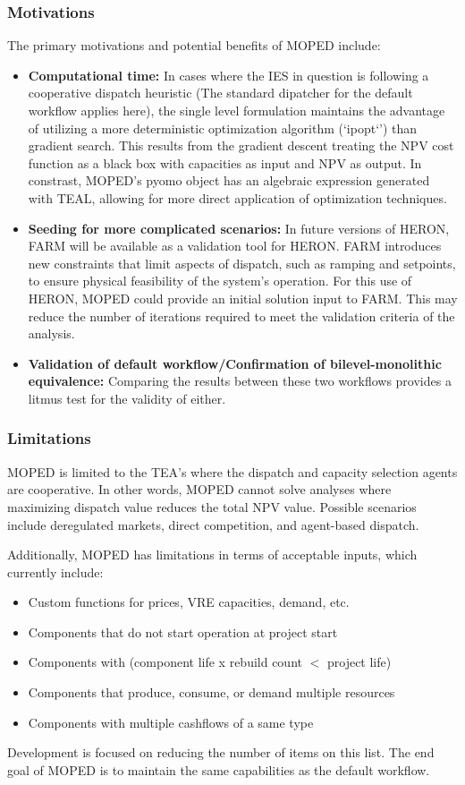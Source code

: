 \subsubsection{Motivations}
The primary motivations and potential benefits of MOPED include:
\begin{itemize}
    \item \textbf{Computational time:} In cases where the IES in question is following a cooperative dispatch heuristic (The standard dipatcher for the default workflow applies here), the single level formulation maintains the advantage of utilizing a more deterministic optimization algorithm
          (`ipopt`') than gradient search. This results from the gradient descent treating the NPV cost function as a black box with capacities as input and NPV as output. In constrast, MOPED's pyomo object has an algebraic expression generated with TEAL, allowing for more direct application of optimization techniques.
    \item \textbf{Seeding for more complicated scenarios:} In future versions of HERON, FARM will be available as a validation tool for HERON. FARM introduces new constraints that limit aspects of dispatch, such as ramping and setpoints, to ensure physical feasibility of the system's operation.
          For this use of HERON, MOPED could provide an initial solution input to FARM. This may reduce the number of iterations required to meet the validation criteria of the analysis.
    \item \textbf{Validation of default workflow/Confirmation of bilevel-monolithic equivalence:} Comparing the results between these two workflows provides a litmus test for the validity of either.
\end{itemize}

\subsubsection{Limitations}
MOPED is limited to the TEA's where the dispatch and capacity selection agents are cooperative. In other words, MOPED cannot solve analyses where maximizing dispatch value reduces the total NPV value. Possible scenarios include deregulated markets, direct competition, and agent-based dispatch.
 
Additionally, MOPED has limitations in terms of acceptable inputs, which currently include:
\begin{itemize}
    \item Custom functions for prices, VRE capacities, demand, etc.
    \item Components that do not start operation at project start
    \item Components with (component life x rebuild count $<$ project life)
    \item Components that produce, consume, or demand multiple resources
    \item Components with multiple cashflows of a same type
\end{itemize}
Development is focused on reducing the number of items on this list. The end goal of MOPED is to maintain the same capabilities as the default workflow.

